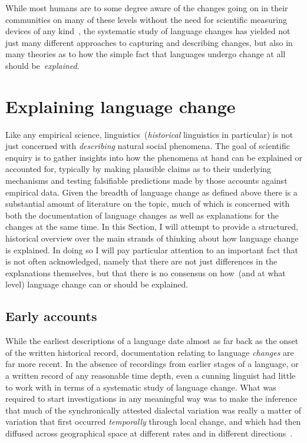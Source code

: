While most humans are to some degree aware of the changes going on in their communities on many of these levels without the need for scientific measuring devices of any kind~\citep{Labov2001,Tagliamonte2012}, the systematic study of language changes has yielded not just many different approaches to capturing and describing changes, but also in many theories as to how the simple fact that languages undergo change at all should be~\emph{explained}.

\section{Explaining language change}

Like any empirical science, linguistics~(\emph{historical} linguistics in particular) is not just concerned with \emph{describing} natural social phenomena. The goal of scientific enquiry is to gather insights into how the phenomena at hand can be explained or accounted for, typically by making plausible claims as to their underlying mechanisms and testing falsifiable predictions made by those accounts against empirical data. Given the breadth of language change as defined above there is a substantial amount of literature on the topic, much of which is concerned with both the documentation of language changes as well as explanations for the changes at the same time.
In this Section, I will attempt to provide a structured, historical overview over the main strands of thinking about how language change is explained.
In doing so I will pay particular attention to an important fact that is not often acknowledged, namely that there are not just differences in the explanations themselves, but that there is no consensus on how~(and at what level) language change can or should be explained.


\subsection{Early accounts}

While the earliest descriptions of a language date almost as far back as the onset of the written historical record, documentation relating to language \emph{changes} are far more recent.
In the absence of recordings from earlier stages of a language, or a written record of any reasonable time depth, even a cunning linguist had little to work with in terms of a systematic study of language change. %
What was required to start investigations in any meaningful way was to make the inference that much of the synchronically attested dialectal variation was really a matter of variation that first occurred \emph{temporally} through local change, and which had then diffused across geographical space at different rates and in different directions~\citep{Chambers1998}.

